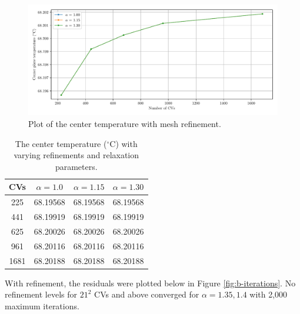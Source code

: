 \documentclass{article}
\begin{document}
\begin{figure}[H]
	\centering
	\includegraphics[width=\linewidth]{../results/b-temps}
	\caption{Plot of the center temperature with mesh refinement.}
	\label{fig:b-temps}
\end{figure}

\def\arraystretch{1.3}
\begin{table}[H]
	\small
	\centering
	\caption{The center temperature ($^\circ$C) with varying refinements and relaxation parameters.}
	\vspace{0.2cm}
	\begin{tabular}{c|c|c|c}
		\hline
		CVs & $\alpha = 1.0$ & $\alpha = 1.15$ & $\alpha = 1.30$ \\     
		\hline
		225  & 68.19568 & 68.19568 & 68.19568 \\
		441  & 68.19919 & 68.19919 & 68.19919 \\
		625  & 68.20026 & 68.20026 & 68.20026 \\
		961  & 68.20116 & 68.20116 & 68.20116 \\
		1681 & 68.20188 & 68.20188 & 68.20188
	\end{tabular}
	\label{table:b-temps}
\end{table}

With refinement, the residuals were plotted below in Figure \ref{fig:b-iterations}. No refinement levels for $21^2$ CVs and above converged for $\alpha = 1.35, 1.4$ with 2,000 maximum iterations.
\end{document}
